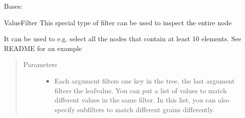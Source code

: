 \documentclass[a4paper,10pt,english]{sphinxmanual}
\begin{document}

\begin{fulllineitems}
\label{\detokenize{fagus.filters:fagus.filters.VFil}}
\pysigstartsignatures
{}
\pysigstopsignatures
\sphinxAtStartPar
Bases: {\hyperref[\detokenize{fagus.filters:fagus.filters.FilBase}]{}}

\sphinxAtStartPar
ValueFilter \sphinxhyphen{} This special type of filter can be used to inspect the entire node

\sphinxAtStartPar
It can be used to e.g. select all the nodes that contain at least 10 elements. See README for an example

\begin{fulllineitems}
\label{\detokenize{fagus.filters:fagus.filters.VFil.__init__}}
\pysigstartsignatures
{}
\pysigstopsignatures\begin{quote}\begin{description}
\item[{Parameters}] \leavevmode\begin{itemize}
\item {}
\sphinxAtStartPar
{} \textendash{} Each argument filters one key in the tree, the last argument filters the leaf\sphinxhyphen{}value. You can
put a list of values to match different values in the same filter. In this list, you can also specify
subfilters to match different grains differently.


\end{itemize}
\end{description}
\end{quote}
\end{fulllineitems}
\end{fulllineitems}
\end{document}
